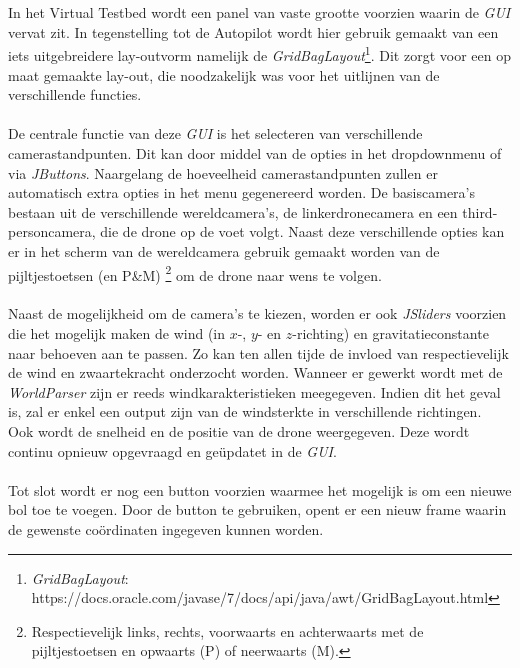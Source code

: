 \\
\\
In het Virtual Testbed wordt een panel van vaste grootte voorzien waarin de \textit{GUI} vervat zit. In tegenstelling tot de Autopilot wordt hier gebruik gemaakt van een iets uitgebreidere lay-outvorm namelijk de \textit{GridBagLayout}\footnote{\textit{GridBagLayout}: https://docs.oracle.com/javase/7/docs/api/java/awt/GridBagLayout.html}. Dit zorgt voor een op maat gemaakte lay-out, die noodzakelijk was voor het uitlijnen van de verschillende functies. 
\\
\\
De centrale functie van deze \textit{GUI} is het selecteren van verschillende camerastandpunten. Dit kan door middel van de opties in het dropdownmenu of via \textit{JButtons}. Naargelang de hoeveelheid camerastandpunten zullen er automatisch extra opties in het menu gegenereerd worden. De basiscamera's bestaan uit de verschillende wereldcamera's, de linkerdronecamera en een third-personcamera, die de drone op de voet volgt. Naast deze verschillende opties kan er in het scherm van de wereldcamera gebruik gemaakt worden van de pijltjestoetsen (en P\&M) \footnote{Respectievelijk links, rechts, voorwaarts en achterwaarts met de pijltjestoetsen en opwaarts (P) of neerwaarts (M).} om de drone naar wens te volgen. 
\\
\\
Naast de mogelijkheid om de camera's te kiezen, worden er ook \textit{JSliders} voorzien die het mogelijk maken de wind (in \(x\)-, \(y\)- en \(z\)-richting) en gravitatieconstante naar behoeven aan te passen. Zo kan ten allen tijde de invloed van respectievelijk de wind en zwaartekracht onderzocht worden. Wanneer er gewerkt wordt met de \textit{WorldParser} zijn er reeds windkarakteristieken meegegeven. Indien dit het geval is, zal er enkel een output zijn van de windsterkte in verschillende richtingen.
\\
Ook wordt de snelheid en de positie van de drone weergegeven. Deze wordt continu opnieuw opgevraagd en ge\"{u}pdatet in de \textit{GUI}. 
\\
\\
Tot slot wordt er nog een button voorzien waarmee het mogelijk is om een nieuwe bol toe te voegen. Door de button te gebruiken, opent er een nieuw frame waarin de gewenste co\"ordinaten ingegeven kunnen worden. 